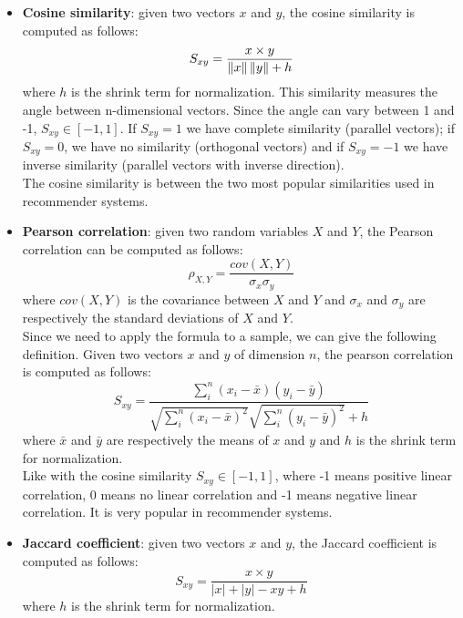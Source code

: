 \begin{itemize}
\item \textbf{Cosine similarity}: given two vectors $x$ and $y$, the cosine similarity is computed as follows:
\begin{equation*}
S_{xy} = \frac{x \times y}{\left\lVert x\right\rVert \left\lVert y\right\rVert + h}
\end{equation*}
where $h$ is the shrink term for normalization.
This similarity measures the angle between n-dimensional vectors. Since the angle can vary between 1 and -1, $S_{xy} \in [-1, 1]$. If $S_{xy} = 1$ we have complete similarity (parallel vectors); if $S_{xy} = 0$, we have no similarity (orthogonal vectors) and if $S_{xy} = -1$ we have inverse similarity (parallel vectors with inverse direction).\\
The cosine similarity is between the two most popular similarities used in recommender systems.
\item \textbf{Pearson correlation}: given two random variables $X$ and $Y$, the Pearson correlation can be computed as follows:
\begin{equation*}
\rho_{X,Y} = \frac{cov(X,Y)}{\sigma_x \sigma_y}
\end{equation*}
where $cov(X,Y)$ is the covariance between $X$ and $Y$ and $\sigma_x$ and $\sigma_y$ are respectively the standard deviations of $X$ and $Y$.\\
Since we need to apply the formula to a sample, we can give the following definition. Given two vectors $x$ and $y$ of dimension $n$, the pearson correlation is computed as follows:
\begin{equation*}
S_{xy} = \frac{\sum_{i}^{n} (x_i - \bar{x})(y_i - \bar{y})}{\sqrt{\sum_{i}^{n} (x_i - \bar{x})^2}\sqrt{\sum_{i}^{n} (y_i - \bar{y})^2} + h}
\end{equation*}
where $\bar{x}$ and $\bar{y}$ are respectively the means of $x$ and $y$ and $h$ is the shrink term for normalization.\\
Like with the cosine similarity $S_{xy} \in [-1, 1]$, where -1 means positive linear correlation, 0 means no linear correlation and -1 means negative linear correlation. It is very popular in recommender systems.
\item \textbf{Jaccard coefficient}: given two vectors $x$ and $y$, the Jaccard coefficient is computed as follows:
\begin{equation*}
S_{xy} = \frac{x \times y}{|x| + |y| - xy + h}
\end{equation*}
where $h$ is the shrink term for normalization.\\

\end{itemize}
